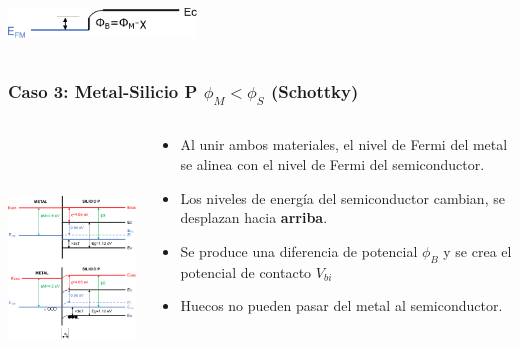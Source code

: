 \documentclass[10pt,t,aspectratio=169]{beamer}
\begin{document}
\begin{frame}[t]
\begin{columns}
\begin{column}{0.5\textwidth}
            \vspace{5mm}
            \centering
            \includegraphics[width=5cm]{./figures/contactos-caso2b.pdf}
            
            
        \end{column}
        
    \end{columns}
    
\end{frame}


\begin{frame}[t]
    \frametitle{Caso 3:	Metal-Silicio P \hspace{1cm} $\phi_M<\phi_S$ \hspace{1cm} (Schottky)}

    \begin{columns}
    
        \begin{column}{0.5\textwidth}
        
            \centering
            \includegraphics[height=7cm]{./figures/contactos-caso3.pdf}
            
        \end{column}
        
        \begin{column}{0.5\textwidth}
        
            \begin{itemize}
                \item Al unir ambos materiales, el nivel de Fermi del metal se alinea con el nivel de Fermi del semiconductor.
                \item Los niveles de energía del semiconductor cambian, se desplazan hacia \textbf{arriba}.
                \item Se produce una diferencia de potencial $\phi_B$ y se crea el potencial de contacto $V_{bi}$
                \item Huecos no pueden pasar del metal al semiconductor.
            \end{itemize}


\end{column}
\end{columns}
\end{frame}
\end{document}
